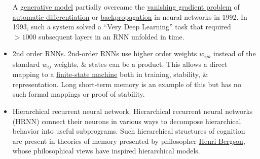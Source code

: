 \documentclass{article}
\begin{document}
\begin{itemize}
	A \href{https://en.wikipedia.org/wiki/Generative_model}{generative model} partially overcame the \href{https://en.wikipedia.org/wiki/Vanishing_gradient_problem}{vanishing gradient problem} of \href{https://en.wikipedia.org/wiki/Automatic_differentiation}{automatic differentiation} or \href{https://en.wikipedia.org/wiki/Backpropagation}{backpropagation} in neural networks in 1992. In 1993, such a system solved a ``Very Deep Learning'' task that required $> 1000$ subsequent layers in an RNN unfolded in time.
	\item {\sf2nd order RNNs.} 2nd-order RNNs use higher order weights $w_{ijk}$ instead of the standard $w_{ij}$ weights, \& states can be a product. This allows a direct mapping to a \href{https://en.wikipedia.org/wiki/Finite-state_machine}{finite-state machine} both in training, stability, \& representation. Long short-term memory is an example of this but has no such formal mappings or proof of stability.
	\item {\sf Hierarchical recurrent neural network.} Hierarchical recurrent neural networks (HRNN) connect their neurons in various ways to decompose hierarchical behavior into useful subprograms. Such hierarchical structures of cognition are present in theories of memory presented by philosopher \href{https://en.wikipedia.org/wiki/Henri_Bergson}{Henri Bergson}, whose philosophical views have inspired hierarchical models.
	

\end{itemize}
\end{document}
